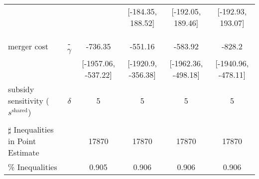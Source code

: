 \begin{tabular}{@{\extracolsep{5pt}}lccccc}
 &  &  & [-184.35, 188.52] & [-192.05, 189.46] & [-192.93, 193.07] \\
 &  &  &  &  &  \\
 &  &  &  &  &  \\
merger cost & -$\gamma$ & -736.35 & -551.16 & -583.92 & -828.2 \\
 &  & [-1957.06, -537.22] & [-1920.9, -356.38] & [-1962.36, -498.18] & [-1940.96, -478.11] \\
subsidy sensitivity ($s^{\text{shared}}$) & $\delta$ & 5 & 5 & 5 & 5 \\
 &  &  &  &  &  \\
\hline 
$\sharp$ Inequalities in Point Estimate &  & 17870 & 17870 & 17870 & 17870 \\
\% Inequalities &  & 0.905 & 0.906 & 0.906 & 0.906 \\
\bottomrule 
\end{tabular}

